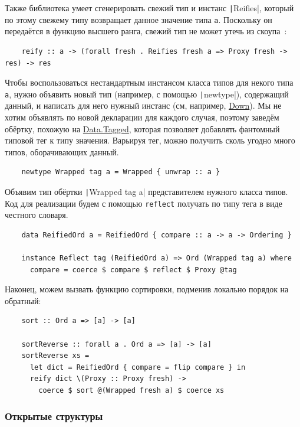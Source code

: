 Также библиотека умеет сгенерировать свежий тип и инстанс \texttt|Reifies|, который по этому свежему типу возвращает данное значение типа \texttt{a}.
Поскольку он передаётся в функцию высшего ранга, свежий тип не может утечь из скоупа~\cite[7.2, ST trick]{maguire-types}:
\begin{verbatim}
    reify :: a -> (forall fresh . Reifies fresh a => Proxy fresh -> res) -> res
\end{verbatim}

Чтобы воспользоваться нестандартным инстансом класса типов для некого типа \texttt{a}, нужно объявить новый тип (например, с помощью \texttt|newtype|), содержащий данный, и написать для него нужный инстанс (см, например, \href{https://hackage.haskell.org/package/base-4.20.0.1/docs/Data-Ord.html#t:Down}{Down}).
Мы не хотим объявлять по новой декларации для каждого случая, поэтому заведём обёртку, похожую на \href{https://hackage.haskell.org/package/tagged-0.8.8/docs/Data-Tagged.html}{Data.Tagged}, которая позволяет добавлять фантомный типовой тег к типу значения.
Варьируя тег, можно получить сколь угодно много типов, оборачивающих данный.
\begin{verbatim}
    newtype Wrapped tag a = Wrapped { unwrap :: a }
\end{verbatim}

Объявим тип обёртки \texttt|Wrapped tag a| представителем нужного класса типов.
Код для реализации будем с помощью \texttt{reflect} получать по типу тега в виде честного словаря.
\begin{verbatim}
    data ReifiedOrd a = ReifiedOrd { compare :: a -> a -> Ordering }

    instance Reflect tag (ReifiedOrd a) => Ord (Wrapped tag a) where
      compare = coerce $ compare $ reflect $ Proxy @tag
\end{verbatim}

Наконец, можем вызвать функцию сортировки, подменив локально порядок на обратный:
\begin{verbatim}
    sort :: Ord a => [a] -> [a]

    sortReverse :: forall a . Ord a => [a] -> [a]
    sortReverse xs =
      let dict = ReifiedOrd { compare = flip compare } in
      reify dict \(Proxy :: Proxy fresh) ->
        coerce $ sort @(Wrapped fresh a) $ coerce xs
\end{verbatim}

\subsubsection{Открытые структуры}

